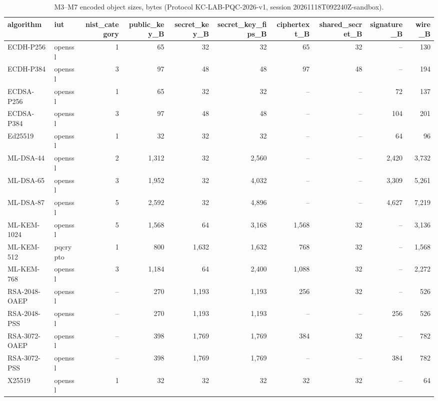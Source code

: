 \begin{table}[ht]
\centering
\caption{M3--M7 encoded object sizes, bytes (Protocol KC-LAB-PQC-2026-v1, session 20261118T092240Z-sandbox).}
\label{tab:t3}
\small
\begin{tabular}{@{}llrrrrrrrr@{}}
\toprule
algorithm & iut & nist\_category & public\_key\_B & secret\_key\_B & secret\_key\_fips\_B & ciphertext\_B & shared\_secret\_B & signature\_B & wire\_B \\
\midrule
ECDH-P256 & openssl & 1 & 65 & 32 & 32 & 65 & 32 & -- & 130 \\
ECDH-P384 & openssl & 3 & 97 & 48 & 48 & 97 & 48 & -- & 194 \\
ECDSA-P256 & openssl & 1 & 65 & 32 & 32 & -- & -- & 72 & 137 \\
ECDSA-P384 & openssl & 3 & 97 & 48 & 48 & -- & -- & 104 & 201 \\
Ed25519 & openssl & 1 & 32 & 32 & 32 & -- & -- & 64 & 96 \\
ML-DSA-44 & openssl & 2 & 1,312 & 32 & 2,560 & -- & -- & 2,420 & 3,732 \\
ML-DSA-65 & openssl & 3 & 1,952 & 32 & 4,032 & -- & -- & 3,309 & 5,261 \\
ML-DSA-87 & openssl & 5 & 2,592 & 32 & 4,896 & -- & -- & 4,627 & 7,219 \\
ML-KEM-1024 & openssl & 5 & 1,568 & 64 & 3,168 & 1,568 & 32 & -- & 3,136 \\
ML-KEM-512 & pqcrypto & 1 & 800 & 1,632 & 1,632 & 768 & 32 & -- & 1,568 \\
ML-KEM-768 & openssl & 3 & 1,184 & 64 & 2,400 & 1,088 & 32 & -- & 2,272 \\
RSA-2048-OAEP & openssl & -- & 270 & 1,193 & 1,193 & 256 & 32 & -- & 526 \\
RSA-2048-PSS & openssl & -- & 270 & 1,193 & 1,193 & -- & -- & 256 & 526 \\
RSA-3072-OAEP & openssl & -- & 398 & 1,769 & 1,769 & 384 & 32 & -- & 782 \\
RSA-3072-PSS & openssl & -- & 398 & 1,769 & 1,769 & -- & -- & 384 & 782 \\
X25519 & openssl & 1 & 32 & 32 & 32 & 32 & 32 & -- & 64 \\
\bottomrule
\end{tabular}
\end{table}
